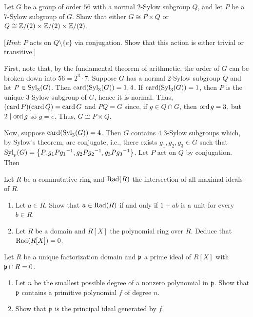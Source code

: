 \begin{problem}
  Let $G$ be a group of order $56$ with a normal $2$-Sylow subgroup $Q$,
  and let $P$ be a $7$-Sylow subgroup of $G$. Show that either $G\cong
  P\times Q$ or $Q\cong\mathbb{Z}/(2)\times\mathbb{Z}/(2)\times\mathbb{Z}/(2)$.

  [\emph{Hint}: $P$ acts on $Q\setminus\{e\}$ via conjugation. Show
  that this action is either trivial or transitive.]
\end{problem}
\begin{solution}
  First, note that, by the fundamental theorem of arithmetic, the order of
  $G$ can be broken down into $56=2^3 \cdot 7$. Suppose $G$ has a normal
  $2$-Sylow subgroup $Q$ and let $P\in\operatorname{Syl}_3(G)$. Then
  $\operatorname{card}(\operatorname{Syl}_3(G))=1,4$. If $\operatorname{card}(\operatorname{Syl}_3(G))=1$, then $P$ is the unique
  $3$-Sylow subgroup of $G$, hence it is normal. Thus,
  $(\operatorname{card} P)(\operatorname{card} Q)=\operatorname{card} G$ and $PQ=G$ since, if $g\in Q\cap G$, then
  $\operatorname{ord} g=3$, but $2\mid \operatorname{ord} g$ so $g=e$. Thus, $G\cong P\times Q$.

  Now, suppose $\operatorname{card}(\operatorname{Syl}_3(G))=4$. Then $G$ contains $4$ $3$-Sylow
  subgroups which, by Sylow's theorem, are conjugate, i.e., there exists
  $g_1,g_2,g_3\in G$ such that
  $\operatorname{Syl}_p(G)=\left\{P,g_1P{g_1}^{-1},g_2P{g_2}^{-1},g_3P{g_3}^{-1}\right\}$. Let
  $P$ act on $Q$ by conjugation. Then
\end{solution}

\begin{problem}
  Let $R$ be a commutative ring and $\operatorname{Rad}(R)$ the intersection of all
  maximal ideals of $R$.
  \begin{enumerate}[label=(\alph*),noitemsep]
  \item Let $a\in R$. Show that $a\in\operatorname{Rad}(R)$ if and only if $1+ab$ is a
    unit for every $b\in R$.
  \item Let $R$ be a domain and $R[X]$ the polynomial ring over
    $R$. Deduce that $\operatorname{Rad}(R[X])=0$.
  \end{enumerate}
\end{problem}
\begin{solution}
\end{solution}

\begin{problem}
  Let $R$ be a unique factorization domain and $\mathfrak{p}$ a prime ideal of $R[X]$
  with $\mathfrak{p}\cap R=0$.
  \begin{enumerate}[label=(\alph*),noitemsep]
  \item Let $n$ be the smallest possible degree of a nonzero polynomial in
    $\mathfrak{p}$. Show that $\mathfrak{p}$ contains a primitive polynomial $f$ of
    degree $n$.
  \item Show that $\mathfrak{p}$ is the principal ideal generated by $f$.
  \end{enumerate}
\end{problem}
\begin{solution}
\end{solution}

